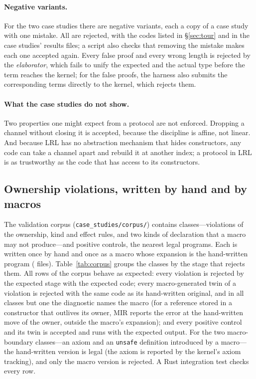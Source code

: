 \paragraph{Negative variants.}
For the two case studies there are \NumCaseNegatives{} negative variants, each a copy of a case study with one mistake.
All are rejected, with the codes listed in \S\ref{sec:tour} and in the case studies' results files; a script also checks that removing the mistake makes each one accepted again.
Every false proof and every wrong length is rejected by the \emph{elaborator}, which fails to unify the expected and the actual type before the term reaches the kernel; for the false proofs, the harness also submits the corresponding terms directly to the kernel, which rejects them.

\paragraph{What the case studies do not show.}
Two properties one might expect from a protocol are not enforced.
Dropping a channel without closing it is accepted, because the discipline is affine, not linear.
And because LRL has no abstraction mechanism that hides constructors, any code can take a channel apart and rebuild it at another index; a protocol in LRL is as trustworthy as the code that has access to its constructors.

\subsection{Ownership violations, written by hand and by macros}\label{sec:eval:corpus}

The validation corpus (\texttt{case\_studies/corpus/}) contains \NumCorpusClasses{} classes---violations of the ownership, kind and effect rules, and two kinds of declaration that a macro may not produce---and \NumCorpusPositives{} positive controls, the nearest legal programs.
Each is written once by hand and once as a macro whose expansion is the hand-written program (\NumCorpusFiles{} files).
Table~\ref{tab:corpus} groups the classes by the stage that rejects them.
All \NumCorpusRows{} rows of the corpus behave as expected: every violation is rejected by the expected stage with the expected code; every macro-generated twin of a violation is rejected with the same code as its hand-written original, and in all classes but one the diagnostic names the macro (for a reference stored in a constructor that outlives its owner, MIR reports the error at the hand-written move of the owner, outside the macro's expansion); and every positive control and its twin is accepted and runs with the expected output.
For the two macro-boundary classes---an axiom and an \lstinline|unsafe| definition introduced by a macro---the hand-written version is legal (the axiom is reported by the kernel's axiom tracking), and only the macro version is rejected.
A Rust integration test checks every row.

